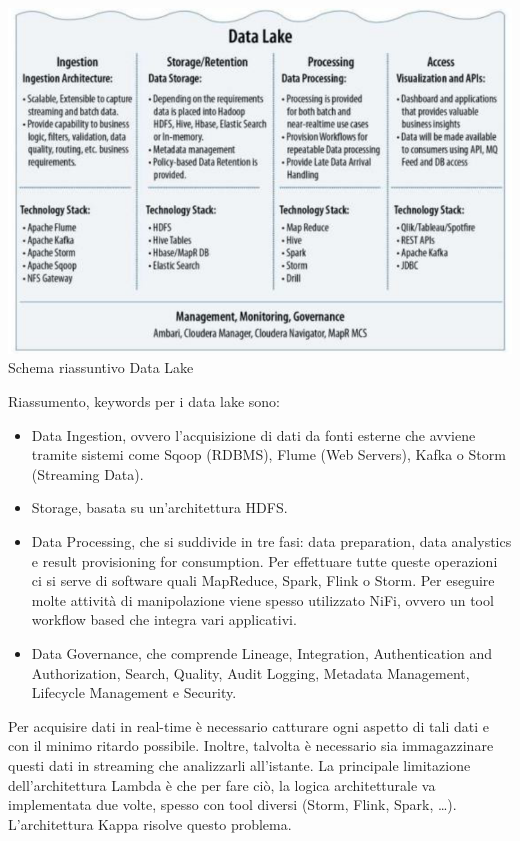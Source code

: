 \documentclass[a4page, 11pt]{article}
\begin{document}
\begin{center}
\includegraphics[scale=0.70]{IMAGE10.png}\\
Schema riassuntivo Data Lake
\end{center}

Riassumento, keywords per i data lake sono:

\begin{itemize}[noitemsep]
\item Data Ingestion, ovvero l’acquisizione di dati da fonti esterne che avviene tramite sistemi come Sqoop (RDBMS), Flume (Web Servers), Kafka o Storm (Streaming Data).
\item Storage, basata su un’architettura HDFS.
\item Data Processing, che si suddivide in tre fasi: data preparation, data analystics e result provisioning for consumption. Per effettuare tutte queste operazioni ci si serve di software quali MapReduce, Spark, Flink o Storm. Per eseguire molte attività di manipolazione viene spesso utilizzato NiFi, ovvero un tool workflow based che integra vari applicativi.
\item Data Governance, che comprende Lineage, Integration, Authentication and Authorization, Search, Quality, Audit Logging, Metadata Management, Lifecycle Management e Security.
\end{itemize}
Per acquisire dati in real-time è necessario catturare ogni aspetto di tali dati e con il minimo ritardo possibile. Inoltre, talvolta è necessario sia immagazzinare questi dati in streaming che analizzarli all’istante. La principale limitazione dell’architettura Lambda è che per fare ciò, la logica architetturale va implementata due volte, spesso con tool diversi (Storm, Flink, Spark, …). L’architettura Kappa risolve questo problema.
\end{document}
